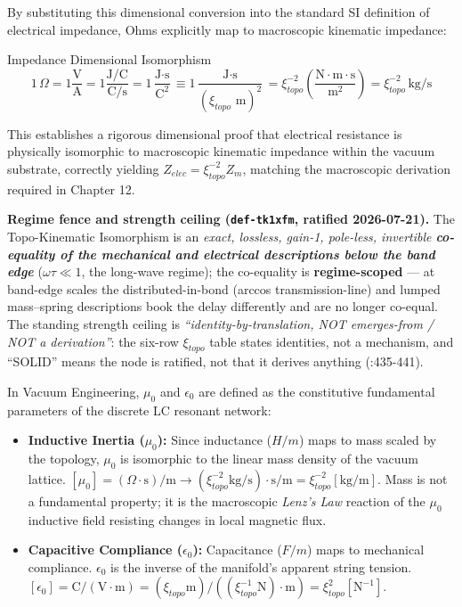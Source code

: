 By substituting this dimensional conversion into the standard SI
definition of electrical impedance, Ohms explicitly map to macroscopic kinematic impedance:

\begin{resultbox}{Impedance Dimensional Isomorphism}
\begin{equation}
1\,\Omega = 1\frac{\text{V}}{\text{A}} = 1\frac{\text{J/C}}{\text{C/s}} = 1\frac{\text{J}\cdot\text{s}}{\text{C}^2} \equiv 1\frac{\text{J}\cdot\text{s}}{(\xi_{topo}\text{ m})^2} = \xi_{topo}^{-2}\left(\frac{\text{N}\cdot\text{m}\cdot\text{s}}{\text{m}^2}\right) = \xi_{topo}^{-2}\,\text{kg/s}
\end{equation}
\end{resultbox}

This establishes a rigorous dimensional proof that electrical resistance is physically isomorphic
to macroscopic kinematic impedance within the vacuum substrate, correctly yielding $Z_{elec}=\xi_{topo}^{-2}Z_{m}$,
matching the macroscopic derivation required in Chapter 12.

\noindent\textbf{Regime fence and strength ceiling (\texttt{def-tk1xfm}, ratified 2026-07-21).} The Topo-Kinematic Isomorphism is an \emph{exact, lossless, gain-1, pole-less, invertible \textbf{co-equality of the mechanical and electrical descriptions below the band edge}} ($\omega\tau \ll 1$, the long-wave regime); the co-equality is \textbf{regime-scoped} --- at band-edge scales the distributed-in-bond (arccos transmission-line) and lumped mass--spring descriptions book the delay differently and are no longer co-equal. The standing strength ceiling is \emph{``identity-by-translation, NOT emerges-from / NOT a derivation''}: the six-row $\xi_{topo}$ table states identities, not a mechanism, and ``SOLID'' means the node is ratified, not that it derives anything (:435-441).

In Vacuum Engineering, $\mu_{0}$ and $\epsilon_{0}$ are defined as the constitutive fundamental parameters of the discrete LC resonant network:

\begin{itemize}
\item \textbf{Inductive Inertia ($\mu_0$):} Since inductance ($H/m$) maps to mass scaled by the topology, $\mu_{0}$ is isomorphic to the linear mass density of the vacuum lattice. $[\mu_{0}] = (\Omega\cdot\text{s})/\text{m} \rightarrow (\xi_{topo}^{-2}\text{kg/s})\cdot\text{s/m} = \xi_{topo}^{-2}[\text{kg/m}]$. Mass is not a fundamental property; it is the macroscopic \textit{Lenz's Law} reaction of the $\mu_0$ inductive field resisting changes in local magnetic flux.
\item \textbf{Capacitive Compliance ($\epsilon_0$):} Capacitance ($F/m$) maps to mechanical compliance. $\epsilon_{0}$ is the inverse of the manifold's apparent string tension. $[\epsilon_{0}] = \text{C}/(\text{V}\cdot\text{m}) = (\xi_{topo}\text{m}) / ((\xi_{topo}^{-1}\text{N})\cdot\text{m}) = \xi_{topo}^2[\text{N}^{-1}]$.
\end{itemize}

